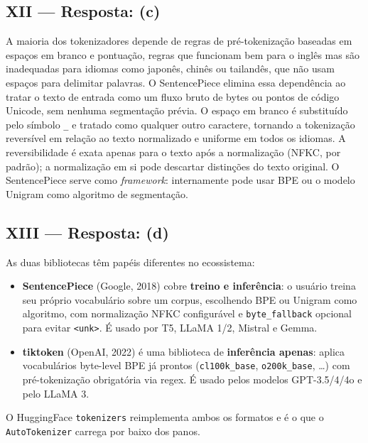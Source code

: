 \documentclass{dlproblemset}
\begin{document}
\subsection*{XII — Resposta: (c)}
A maioria dos tokenizadores depende de regras de pré-tokenização baseadas em espaços
em branco e pontuação, regras que funcionam bem para o inglês mas são inadequadas para
idiomas como japonês, chinês ou tailandês, que não usam espaços para delimitar palavras.
O SentencePiece elimina essa dependência ao tratar o texto de entrada como um fluxo
bruto de bytes ou pontos de código Unicode, sem nenhuma segmentação prévia. O espaço
em branco é substituído pelo símbolo \texttt{\_} e tratado como qualquer outro caractere,
tornando a tokenização reversível em relação ao texto normalizado e uniforme em todos
os idiomas. A reversibilidade é exata apenas para o texto após a normalização
(NFKC, por padrão); a normalização em si pode descartar distinções do texto original.
O SentencePiece serve como \emph{framework}: internamente pode usar BPE ou o modelo
Unigram como algoritmo de segmentação.

\subsection*{XIII — Resposta: (d)}
As duas bibliotecas têm papéis diferentes no ecossistema:
\begin{itemize}
  \item \textbf{SentencePiece} (Google, 2018) cobre \textbf{treino e inferência}: o
        usuário treina seu próprio vocabulário sobre um corpus, escolhendo BPE ou
        Unigram como algoritmo, com normalização NFKC configurável e
        \texttt{byte\_fallback} opcional para evitar \texttt{<unk>}. É usado por
        T5, LLaMA 1/2, Mistral e Gemma.
  \item \textbf{tiktoken} (OpenAI, 2022) é uma biblioteca de \textbf{inferência
        apenas}: aplica vocabulários byte-level BPE já prontos
        (\texttt{cl100k\_base}, \texttt{o200k\_base}, \ldots) com pré-tokenização
        obrigatória via regex. É usado pelos modelos GPT-3.5/4/4o e pelo LLaMA 3.
\end{itemize}
O HuggingFace \texttt{tokenizers} reimplementa ambos os formatos e é o que o
\texttt{AutoTokenizer} carrega por baixo dos panos.

\end{document}
